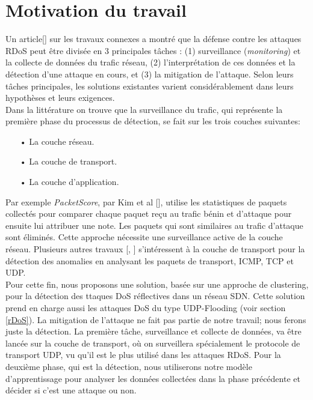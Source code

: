 \section{Motivation du travail}
Un article[\cite{24}] sur les travaux connexes a montré que la défense contre les attaques RDoS peut être divisée en 3 principales tâches : (1) surveillance (\textit{monitoring}) et la collecte de données du trafic réseau, (2) l’interprétation de ces données et la détection d’une attaque en cours, et (3) la mitigation de l’attaque. Selon leurs tâches principales, les solutions existantes varient considérablement dans leurs hypothèses et leurs exigences.\\
Dans la littérature on trouve que la surveillance du trafic, qui représente la première phase du processus de détection, se fait sur les trois couches suivantes:\\
\begin{itemize}
\item[•] La couche réseau.
\item[•] La couche de transport.
\item[•] La couche d'application.\\
\end{itemize}
\newpage
Par exemple \textit{PacketScore}, par Kim et al [\cite{25}], utilise les statistiques de paquets collectés pour comparer chaque paquet reçu au trafic bénin et d’attaque pour ensuite lui attribuer une note. Les paquets qui sont similaires au trafic d’attaque sont éliminés. Cette approche nécessite une surveillance active de la couche réseau. Plusieurs autres travaux [\cite{26}, \cite{27}] s'intéressent à la couche de transport pour la détection des anomalies en analysant les paquets de transport, ICMP, TCP et UDP.\\

Pour cette fin, nous proposons une solution, basée sur une approche de clustering, pour la détection des ttaques DoS réflectives dans un réseau SDN. Cette solution prend en charge aussi les attaques DoS du type UDP-Flooding (voir section \ref{rDoS}). La mitigation de l'attaque ne fait pas partie de notre travail; nous ferons juste la détection. La première tâche, surveillance et collecte de données, va être lancée sur la couche de transport, où on surveillera spécialement le protocole de transport UDP, vu qu'il est le plus utilisé dans les attaques RDoS. Pour la deuxième phase, qui est la détection, nous utiliserons notre modèle d'apprentissage pour analyser les données collectées dans la phase précédente et décider si c'est une attaque ou non.

